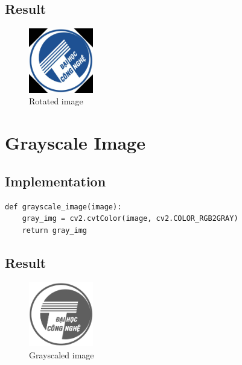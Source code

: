 \subsection{Result}
\begin{figure} [h]
    \centering
    \includegraphics[width=0.25\textwidth]{img/uet_rotated.jpg}
    \caption{Rotated image}
\end{figure}

\section{Grayscale Image}
\subsection{Implementation}
\begin{verbatim}
def grayscale_image(image):
    gray_img = cv2.cvtColor(image, cv2.COLOR_RGB2GRAY)
    return gray_img
\end{verbatim}

\subsection{Result}
\begin{figure} [h]
    \centering
    \includegraphics[width=0.25\textwidth]{img/lena_gray.jpg}
    \caption{Grayscaled image}
\end{figure}











